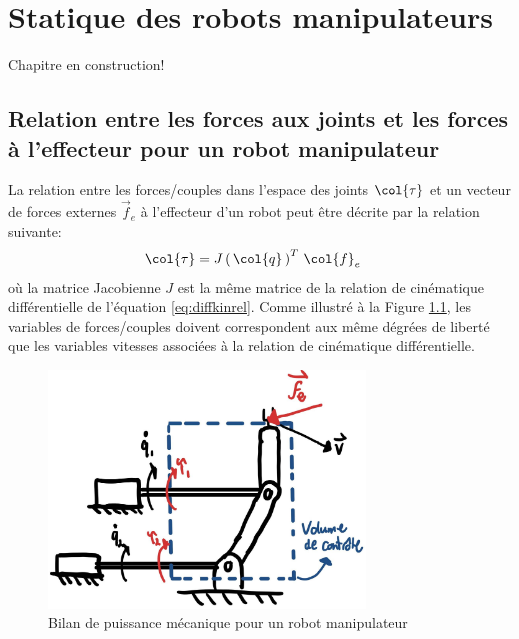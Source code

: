 \chapter{Statique des robots manipulateurs}
\label{sec:static}

Chapitre en construction!

\section{Relation entre les forces aux joints et les forces à l'effecteur pour un robot manipulateur}
\label{sec:manipstatic}

La relation entre les forces/couples dans l'espace des joints $\col{\tau}$ et un vecteur de forces externes $\vec{f}_e$ à l'effecteur d'un robot peut être décrite par la relation suivante:
\begin{align}
\col{\tau} &= J\left( \, \col{q} \, \right)^T \, \col{f}_e 
\label{eq:staticmanipulator}
\end{align}
où la matrice Jacobienne $J$ est la même matrice de la relation de cinématique différentielle de l'équation \ref{eq:diffkinrel}. Comme illustré à la Figure \ref{fig:controlvolume}, les variables de forces/couples doivent correspondent aux même dégrées de liberté que les variables vitesses associées à la relation de cinématique différentielle. 
\begin{figure}[H]
	\centering
		\includegraphics[width=0.75\textwidth]{fig/controlvolume.jpg}
	\caption{Bilan de puissance mécanique pour un robot manipulateur}
	\label{fig:controlvolume}
\end{figure}

